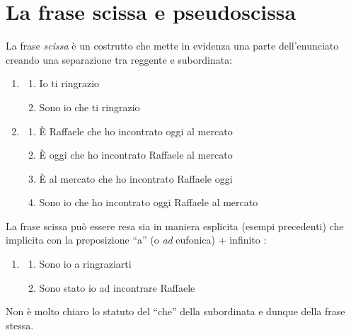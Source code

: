 \documentclass[
  a4paper,
  twoside,
  11pt,
  chapterprefix=false,
  bibliography=totocnumbered,
  listof=flat]{scrbook}
\providecommand{\tightlist}{%
  \setlength{\itemsep}{0pt}\setlength{\parskip}{0pt}}
\begin{document}
\hypertarget{la-frase-scissa-e-pseudoscissa}{%
\section{La frase scissa e pseudoscissa}\label{la-frase-scissa-e-pseudoscissa}}

La frase \emph{scissa} è un costrutto che mette in evidenza una parte dell'enunciato creando una separazione tra reggente e subordinata:

\begin{enumerate}
\def\labelenumi{(\arabic{enumi})}
\setcounter{enumi}{176}
\item
  \begin{enumerate}
  \def\labelenumii{\alph{enumii}.}
  \tightlist
  \item
    Io ti ringrazio
  \item
    Sono io che ti ringrazio
  \end{enumerate}
\item
  \begin{enumerate}
  \def\labelenumii{\alph{enumii}.}
  \tightlist
  \item
    È Raffaele che ho incontrato oggi al mercato
  \item
    È oggi che ho incontrato Raffaele al mercato
  \item
    È al mercato che ho incontrato Raffaele oggi
  \item
    Sono io che ho incontrato oggi Raffaele al mercato
  \end{enumerate}
\end{enumerate}

La frase scissa può essere resa sia in maniera esplicita (esempi precedenti) che implicita con la preposizione \enquote{a} (o \emph{ad} eufonica) + infinito :

\begin{enumerate}
\def\labelenumi{(\arabic{enumi})}
\setcounter{enumi}{178}
\item
  \begin{enumerate}
  \def\labelenumii{\alph{enumii}.}
  \tightlist
  \item
    Sono io a ringraziarti
  \item
    Sono stato io ad incontrare Raffaele
  \end{enumerate}
\end{enumerate}

Non è molto chiaro lo statuto del \enquote{che} della subordinata e dunque della frase stessa.
\end{document}
